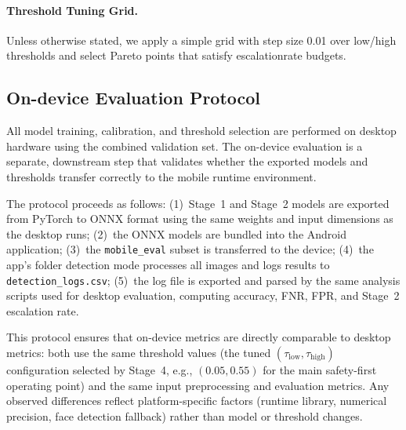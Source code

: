 \paragraph{Threshold Tuning Grid.} Unless otherwise stated, we apply a simple grid with step size 0.01 over low/high thresholds and select Pareto points that satisfy escalation\-rate budgets.

\subsection*{On-device Evaluation Protocol}
\label{sec:ondevice_protocol}
All model training, calibration, and threshold selection are performed on desktop hardware using the combined validation set. The on\hyp device evaluation is a separate, downstream step that validates whether the exported models and thresholds transfer correctly to the mobile runtime environment.

The protocol proceeds as follows: (1)~Stage~1 and Stage~2 models are exported from PyTorch to ONNX format using the same weights and input dimensions as the desktop runs; (2)~the ONNX models are bundled into the Android application; (3)~the \texttt{mobile\_eval} subset is transferred to the device; (4)~the app's folder detection mode processes all images and logs results to \texttt{detection\_logs.csv}; (5)~the log file is exported and parsed by the same analysis scripts used for desktop evaluation, computing accuracy, FNR, FPR, and Stage~2 escalation rate.

This protocol ensures that on\hyp device metrics are directly comparable to desktop metrics: both use the same threshold values (the tuned $(\tau_\mathrm{low},\tau_\mathrm{high})$ configuration selected by Stage~4, e.g., $(0.05,0.55)$ for the main safety\hyp first operating point) and the same input preprocessing and evaluation metrics. Any observed differences reflect platform\hyp specific factors (runtime library, numerical precision, face detection fallback) rather than model or threshold changes.
